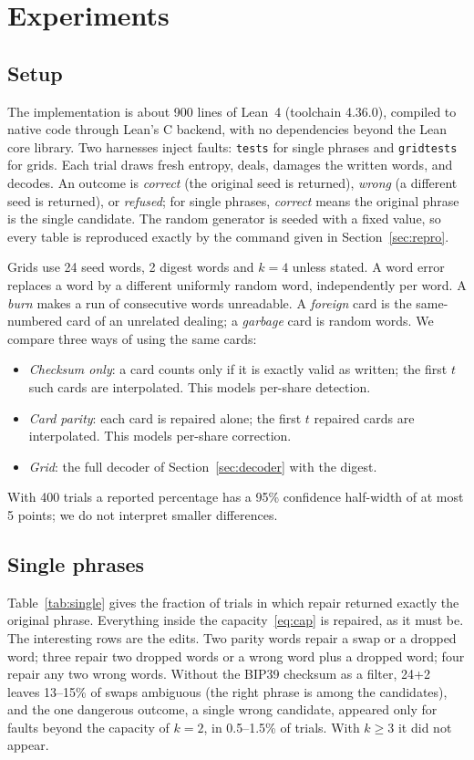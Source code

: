 \documentclass[numeric]{anvil-paper}
\newcommand{\code}[1]{\texttt{#1}}
\begin{document}
\section{Experiments}
\label{sec:experiments}

\subsection{Setup}

The implementation is about 900 lines of Lean~4 (toolchain 4.36.0), compiled
to native code through Lean's C backend, with no dependencies beyond the Lean
core library. Two harnesses inject faults: \code{tests} for single phrases and
\code{gridtests} for grids. Each trial draws fresh entropy, deals, damages the
written words, and decodes. An outcome is \emph{correct} (the original seed is
returned), \emph{wrong} (a different seed is returned), or \emph{refused}; for
single phrases, \emph{correct} means the original phrase is the single
candidate. The random generator is seeded with a fixed value, so every table is
reproduced exactly by the command given in Section~\ref{sec:repro}.

Grids use 24 seed words, 2 digest words and $k=4$ unless stated. A word error
replaces a word by a different uniformly random word, independently per word.
A \emph{burn} makes a run of consecutive words unreadable. A \emph{foreign}
card is the same-numbered card of an unrelated dealing; a \emph{garbage} card
is random words. We compare three ways of using the same cards:
\begin{itemize}
\item \emph{Checksum only}: a card counts only if it is exactly valid as
  written; the first $t$ such cards are interpolated. This models per-share
  detection.
\item \emph{Card parity}: each card is repaired alone; the first $t$ repaired
  cards are interpolated. This models per-share correction.
\item \emph{Grid}: the full decoder of Section~\ref{sec:decoder} with the
  digest.
\end{itemize}
With 400 trials a reported percentage has a 95\% confidence half-width of at
most 5 points; we do not interpret smaller differences.

\subsection{Single phrases}

Table~\ref{tab:single} gives the fraction of trials in which repair returned
exactly the original phrase. Everything inside the capacity~\eqref{eq:cap} is
repaired, as it must be. The interesting rows are the edits. Two parity words
repair a swap or a dropped word; three repair two dropped words or a wrong word
plus a dropped word; four repair any two wrong words. Without the BIP39
checksum as a filter, 24+2 leaves 13--15\% of swaps ambiguous (the right phrase
is among the candidates), and the one dangerous outcome, a single wrong
candidate, appeared only for faults beyond the capacity of $k=2$, in 0.5--1.5\%
of trials. With $k\ge 3$ it did not appear.
\end{document}
